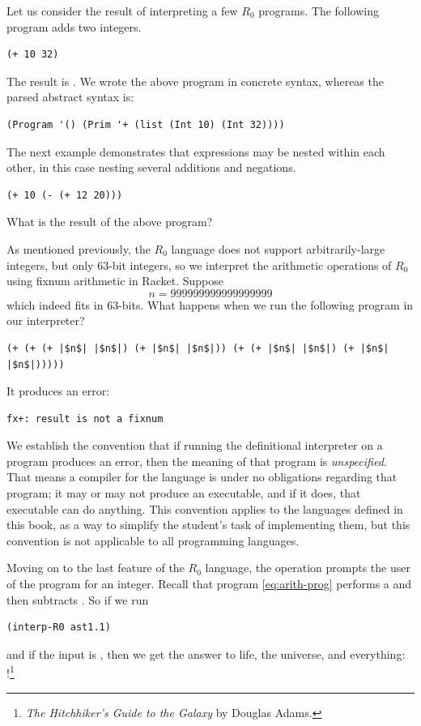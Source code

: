 \documentclass[11pt]{book}
\begin{document}
Let us consider the result of interpreting a few $R_0$ programs. The
following program adds two integers.
\begin{lstlisting}
(+ 10 32)
\end{lstlisting}
The result is .  We wrote the above program in concrete syntax,
whereas the parsed abstract syntax is:
\begin{lstlisting}
(Program '() (Prim '+ (list (Int 10) (Int 32))))
\end{lstlisting}

The next example demonstrates that expressions may be nested within
each other, in this case nesting several additions and negations.
\begin{lstlisting}
(+ 10 (- (+ 12 20)))
\end{lstlisting}
What is the result of the above program?

As mentioned previously, the $R_0$ language does not support
arbitrarily-large integers, but only $63$-bit integers, so we
interpret the arithmetic operations of $R_0$ using fixnum arithmetic
in Racket.
Suppose
\[
  n = 999999999999999999
\]
which indeed fits in $63$-bits.  What happens when we run the
following program in our interpreter?
\begin{lstlisting}
(+ (+ (+ |$n$| |$n$|) (+ |$n$| |$n$|)) (+ (+ |$n$| |$n$|) (+ |$n$| |$n$|)))))
\end{lstlisting}
It produces an error:
\begin{lstlisting}
fx+: result is not a fixnum
\end{lstlisting}
We establish the convention that if running the definitional
interpreter on a program produces an error, then the meaning of that
program is \emph{unspecified}. That means a compiler for the language
is under no obligations regarding that program; it may or may not
produce an executable, and if it does, that executable can do
anything. This convention applies to the languages defined in this
book, as a way to simplify the student's task of implementing them,
but this convention is not applicable to all programming languages.

Moving on to the last feature of the $R_0$ language, the 
operation prompts the user of the program for an integer.  Recall that
program \eqref{eq:arith-prog} performs a  and then subtracts
. So if we run
\begin{lstlisting}
(interp-R0 ast1.1)
\end{lstlisting}
and if the input is , then we get the answer to life, the
universe, and everything: !\footnote{\emph{The Hitchhiker's
    Guide to the Galaxy} by Douglas Adams.}
\end{document}
